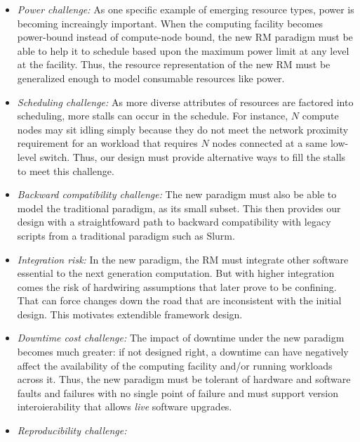 \documentclass{article}
\newcommand{\slurm}{Slurm}
\begin{document}
\begin{itemize}
\item{\sl Power challenge:} As one specific example of emerging resource types,
      power is becoming increaingly important. When the computing
      facility becomes power-bound instead of compute-node bound, the new
      RM paradigm must be able to help it to schedule based upon the 
      maximum power limit at any level at the facility. Thus, 
      the resource representation of the new RM must be generalized
      enough to model consumable resources like power.  
      
\item{\sl Scheduling challenge:} As more diverse attributes of resources
      are factored into scheduling, more stalls can occur in the schedule.
      For instance, $N$ compute nodes may sit idling simply because they do not meet
      the network proximity requirement for an workload that requires 
      $N$ nodes connected at a same low-level switch. Thus, our design 
      must provide alternative ways to fill the stalls to meet this 
      challenge.

\item{\sl Backward compatibility challenge:} The new paradigm must also be
      able to model the traditional paradigm, as its small subset. This
      then provides our design with a straightfoward path to 
      backward compatibility with legacy scripts from a traditional 
      paradigm such as \slurm.

\item{\sl Integration risk:} In the new paradigm, the RM must 
     integrate other software essential to the next generation computation. 
     But with higher integration comes the risk of hardwiring assumptions
     that later prove to be confining. That can force changes down the road
     that are inconsistent with the initial design. This motivates
     extendible framework design. 
     
\item{\sl Downtime cost challenge:} The impact of downtime under the 
     new paradigm becomes much greater: if not designed right, 
     a downtime can have negatively affect the availability of
     the computing facility and/or running workloads across it.
     Thus, the new paradigm must be tolerant of hardware and software faults 
     and failures with no single point of failure and must support version 
     interoierability that allows {\em live} software upgrades.

\item{\sl Reproducibility challenge:} %



\end{itemize}
\end{document}
